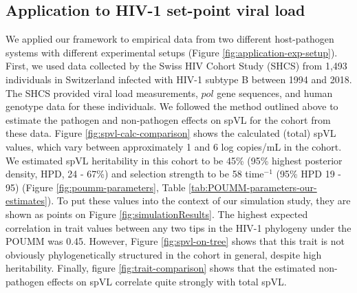 \documentclass[11pt]{article}
\begin{document}
\begin{linenumbers}


\subsection*{Application to HIV-1 set-point viral load}

We applied our framework to empirical data from two different host-pathogen systems with different experimental setups (Figure \ref{fig:application-exp-setup}). First, we used data collected by the Swiss HIV Cohort Study (SHCS) from 1,493 individuals in Switzerland infected with HIV-1 subtype B between 1994 and 2018. The SHCS provided viral load measurements, $pol$ gene sequences, and human genotype data for these individuals. We followed the method outlined above to estimate the pathogen and non-pathogen effects on spVL for the cohort from these data. Figure \ref{fig:spvl-calc-comparison} shows the calculated (total) spVL values, which vary between approximately 1 and 6 log copies/mL in the cohort.  We estimated spVL heritability in this cohort to be 45\% (95\% highest posterior density, HPD, 24 - 67\%) and selection strength to be 58 time$^{-1}$ (95\% HPD 19 - 95) (Figure \ref{fig:poumm-parameters}, Table \ref{tab:POUMM-parameters-our-estimates}). To put these values into the context of our simulation study, they are shown as points on Figure \ref{fig:simulationResults}. The highest expected correlation in trait values between any two tips in the HIV-1 phylogeny under the POUMM was 0.45. However, Figure \ref{fig:spvl-on-tree} shows that this trait is not obviously phylogenetically structured in the cohort in general, despite high heritability. Finally, figure \ref{fig:trait-comparison} shows that the estimated non-pathogen effects on spVL correlate quite strongly with total spVL. 



\end{linenumbers}
\end{document}
